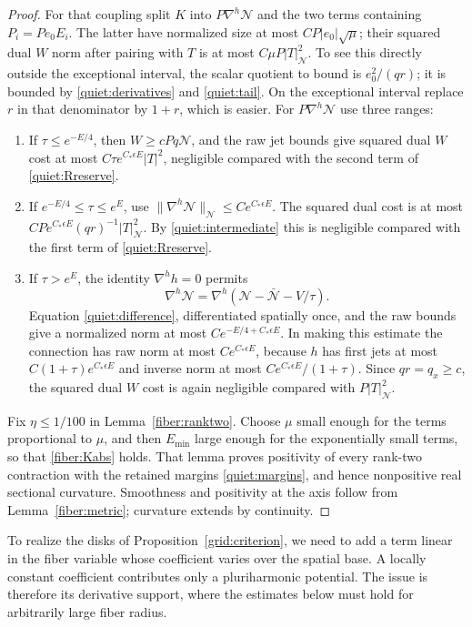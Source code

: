 \begin{proof}
For that coupling split \(K\) into \(P\nabla^h\mathcal N\) and the two
terms containing \(P_i=Pe_0E_i\).  The latter have normalized size at
most \(CP|e_0|\sqrt\mu\); their squared dual \(W\) norm after pairing
with \(T\) is at most \(C\mu P|T|_{\mathcal N}^2\).  To see this directly
outside the exceptional interval, the scalar quotient to bound is
\(e_0^2/(qr)\); it is bounded by \eqref{quiet:derivatives} and
\eqref{quiet:tail}.  On the exceptional interval replace \(r\) in that
denominator by \(1+r\), which is easier.
For \(P\nabla^h\mathcal N\) use three ranges:
\begin{enumerate}
\item If \(\tau\le e^{-E/4}\), then \(W\ge cPq\mathcal N\), and
the raw jet bounds give squared dual \(W\) cost at most
\(C\tau e^{C_*\epsilon E}|T|^2\), negligible compared with the
second term of \eqref{quiet:Rreserve}.
\item If \(e^{-E/4}\le\tau\le e^E\), use
\(\|\nabla^h\mathcal N\|_{\mathcal N}\le Ce^{C_*\epsilon E}\).
The squared dual cost is at most
\(CPe^{C_*\epsilon E}(qr)^{-1}|T|_{\mathcal N}^2\).
By \eqref{quiet:intermediate} this is negligible compared with
the first term of \eqref{quiet:Rreserve}.
\item If \(\tau>e^E\), the identity \(\nabla^h h=0\) permits
\[
 \nabla^h\mathcal N
   =\nabla^h(\mathcal N-\bar{\mathcal N}-V/\tau).
\]
Equation \eqref{quiet:difference}, differentiated spatially once,
and the raw bounds give a normalized norm at most
\(C e^{-E/4+C_*\epsilon E}\).  In making this estimate the connection
has raw norm at most \(Ce^{C_*\epsilon E}\), because \(h\) has first
jets at most \(C(1+\tau)e^{C_*\epsilon E}\) and inverse norm at most
\(Ce^{C_*\epsilon E}/(1+\tau)\).  Since \(qr=q_x\ge c\), the
squared dual \(W\) cost is again negligible compared with
\(P|T|_{\mathcal N}^2\).
\end{enumerate}
Fix \(\eta\le1/100\) in Lemma~\ref{fiber:ranktwo}.  Choose \(\mu\)
small enough for the terms proportional to \(\mu\), and then
\(E_{\min}\) large enough for the exponentially small terms, so that
\eqref{fiber:Kabs} holds.  That lemma proves positivity of every
rank-two contraction with the retained margins
\eqref{quiet:margins}, and hence nonpositive real sectional curvature.
Smoothness and positivity at the axis follow from
Lemma~\ref{fiber:metric}; curvature extends by continuity.
\end{proof}

To realize the disks of Proposition~\ref{grid:criterion}, we need to
add a term linear in the fiber variable whose coefficient varies over
the spatial base. A locally constant coefficient contributes only a
pluriharmonic potential. The issue is therefore its derivative support,
where the estimates below must hold for arbitrarily large fiber radius.

